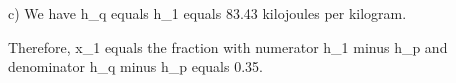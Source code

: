 c) We have h_q equals h_1 equals 83.43 kilojoules per kilogram.

Therefore,
x_1 equals the fraction with numerator h_1 minus h_p and denominator h_q minus h_p equals 0.35.